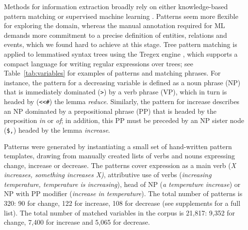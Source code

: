 \documentclass[11pt]{article}
\begin{document}
Methods for information extraction broadly rely on either knowledge-based pattern matching or supervised machine learning \cite{Sarawagi:2008:IE:1498844.1498845}.
Patterns seem more flexible for exploring the domain, whereas the manual annotation required for ML demands more commitment to a precise definition of entities, relations and events, which we found hard to achieve at this stage.
Tree pattern matching is applied to lemmatised syntax trees using the Tregex engine \cite{Levy2006}, which supports a compact language for writing regular expressions over trees; 
see Table~\ref{tab:variables} for examples of patterns and matching phrases.
For instance, the pattern for a decreasing variable is defined as a noun phrase (NP) that is immediately dominated (\verb|>|) by a verb phrase (VP), which in turn is headed by (\verb|<<#|) the lemma \emph{reduce}.
Similarly, the pattern for increase describes an NP dominated by a prepositional phrase (PP) that is headed by the preposition \emph{in} or \emph{of}; in addition, this PP must be preceded by an NP sister node (\verb|$,|) headed by the lemma \emph{increase}.

Patterns were generated by instantiating a small set of hand-written pattern templates, drawing from manually created lists of verbs and nouns expressing change, increase or decrease. 
The patterns cover expression as a main verb (\emph{X increases, something increases X)}, attributive use of verbs (\emph{increasing temperature, temperature is increasing}), head of NP (\emph{a temperature increase}) or NP with PP modifier (\emph{increase in temperature}).
The total number of patterns is 320: 90 for change, 122 for increase, 108 for decrease (see supplements for a full list).
The total number of matched variables in the corpus is 21,817: 9,352 for change, 7,400 for increase and 5,065 for decrease.


 
\end{document}

